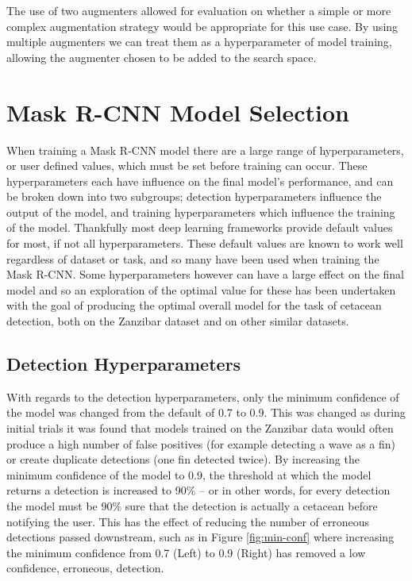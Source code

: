 The use of two augmenters allowed for evaluation on whether a simple or more complex augmentation strategy would be appropriate for this use case. By using multiple augmenters we can treat them as a hyperparameter of model training, allowing the augmenter chosen to be added to the search space.

\section{Mask R-CNN Model Selection}\label{ch:cetDet,sec:ModelSelection}

When training a Mask R-CNN model there are a large range of hyperparameters, or user defined values, which must be set before training can occur. These hyperparameters each have influence on the final model's performance, and can be broken down into two subgroups; detection hyperparameters influence the output of the model, and training hyperparameters which influence the training of the model. Thankfully most deep learning frameworks provide default values for most, if not all hyperparameters. These default values are known to work well regardless of dataset or task, and so many have been used when training the Mask R-CNN. Some hyperparameters however can have a large effect on the final model and so an exploration of the optimal value for these has been undertaken with the goal of producing the optimal overall model for the task of cetacean detection, both on the Zanzibar dataset and on other similar datasets. 

\subsection{Detection Hyperparameters}\label{ch:cetDet,sec:ModelSelection,sub:DetectionHyperparameters}
 
 With regards to the detection hyperparameters, only the minimum confidence of the model was changed from the default of 0.7 to 0.9. This was changed as during initial trials it was found that models trained on the Zanzibar data would often produce a high number of false positives (for example detecting a wave as a fin) or create duplicate detections (one fin detected twice). By increasing the minimum confidence of the model to 0.9, the threshold at which the model returns a detection is increased to 90\% -- or in other words, for every detection the model must be 90\% sure that the detection is actually a cetacean before notifying the user. This has the effect of reducing the number of erroneous detections passed downstream, such as in Figure \ref{fig:min-conf} where increasing the minimum confidence from 0.7 (Left) to 0.9 (Right) has removed a low confidence, erroneous, detection. 
 
